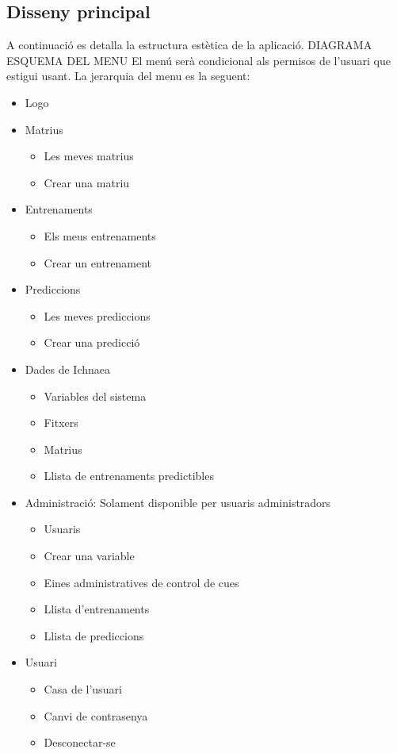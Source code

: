 \subsection{Disseny principal}
A continuació es detalla la estructura estètica de la aplicació.
DIAGRAMA
ESQUEMA DEL MENU
El menú serà condicional als permisos de l'usuari que estigui usant. La jerarquia del menu es la seguent:
\begin{itemize}
\item Logo
\item Matrius
 \begin{itemize}
 \item Les meves matrius
 \item Crear una matriu
  \end{itemize}
\item Entrenaments
 \begin{itemize}
 \item Els meus entrenaments
 \item Crear un entrenament
 \end{itemize} 
\item Prediccions
 \begin{itemize}
 \item Les meves prediccions
 \item Crear una predicció
 \end{itemize} 
\item Dades de Ichnaea 
 \begin{itemize}
 \item Variables del sistema
 \item Fitxers
 \item Matrius
 \item Llista de entrenaments predictibles
 \end{itemize} 
\item Administració: Solament disponible per usuaris administradors
\begin{itemize}
\item Usuaris
\item Crear una variable
\item Eines administratives de control de cues
\item Llista d'entrenaments
\item Llista de prediccions
\end{itemize}
\item Usuari
 \begin{itemize}
 \item Casa de l'usuari
 \item Canvi de contrasenya
 \item Desconectar-se
 \end{itemize}
\end{itemize}


